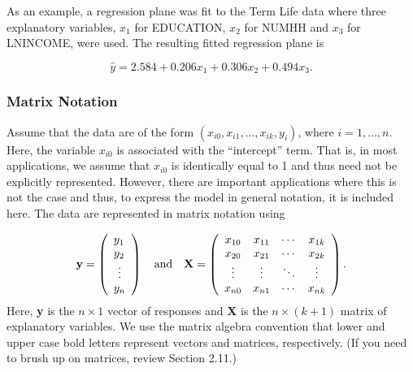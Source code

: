 As an example, a regression plane was fit to the Term Life data
where three explanatory variables, $x_1$ for EDUCATION, $x_2$ for
NUMHH and $x_3$ for LNINCOME, were used. The resulting fitted
regression plane is

\begin{equation}\label{E3:TermRegression}
\widehat{y} = 2.584 + 0.206 x_1 + 0.306 x_2 + 0.494 x_3.
\end{equation}


\subsubsection*{Matrix Notation}

Assume that the data are of the form
$(x_{i0},x_{i1},\ldots,x_{ik},y_i)$, where $i = 1, \ldots, n$. Here,
the variable $x_{i0}$ is associated with the ``intercept'' term. That
is, in most applications, we assume that $x_{i0}$ is identically
equal to 1 and thus need not be explicitly represented. However,
there are important applications where this is not the case and
thus, to express the model in general notation, it is included here.
The data are represented in matrix notation using


\begin{equation*}
\mathbf{y}=\left(
\begin{array}{l}
y_1 \\
y_2 \\
\multicolumn{1}{c}{\vdots} \\
y_n%
\end{array}%
\right) ~~~\mathrm{and}~~~\mathbf{X}=\left(
\begin{array}{cccc}
x_{10} & x_{11} & \cdots & x_{1k} \\
x_{20} & x_{21} & \cdots & x_{2k} \\
\vdots & \vdots & \ddots & \vdots \\
x_{n0} & x_{n1} & \cdots & x_{nk}%
\end{array}%
\right) .
\end{equation*}%
Here, \textbf{y} is the $n\times 1$ vector of responses and
\textbf{X} is the $n\times (k+1)$ matrix of explanatory variables.
We use the matrix algebra convention that lower and upper case bold
letters represent vectors and matrices, respectively. (If you need
to brush up on matrices, review Section 2.11.)

\linejed

